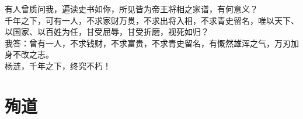 \begin{multicols}{\theparacolNo}
有人曾质问我，遍读史书如你，所见皆为帝王将相之家谱，有何意义？\\

千年之下，可有一人，不求家财万贯，不求出将入相，不求青史留名，唯以天下、以国家、以百姓为任，甘受屈辱，甘受折磨，视死如归？\\

我答：曾有一人，不求钱财，不求富贵，不求青史留名，有慨然雄浑之气，万刃加身不改之志。\\

杨涟，千年之下，终究不朽！\\

\ifnum{}
	\end{multicols}
\fi
\newpage
\section{殉道}
\ifnum{}
